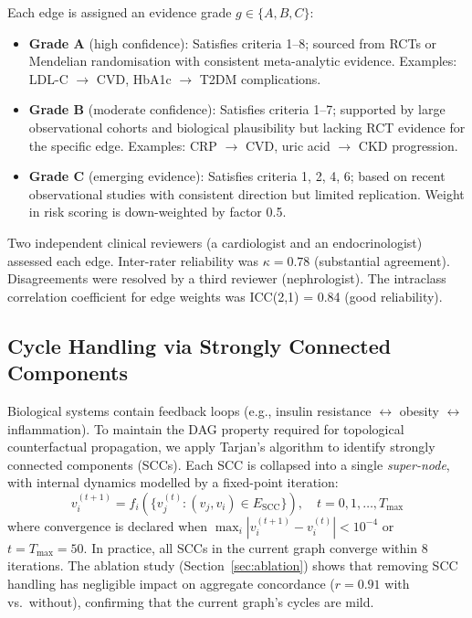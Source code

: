 \documentclass[runningheads]{llncs}
\begin{document}
Each edge is assigned an evidence grade $g \in \{A, B, C\}$:
\begin{itemize}
\item \textbf{Grade A} (high confidence): Satisfies criteria
  1--8; sourced from RCTs or Mendelian randomisation with consistent
  meta-analytic evidence.  Examples: LDL-C $\rightarrow$ CVD, HbA1c
  $\rightarrow$ T2DM complications.
\item \textbf{Grade B} (moderate confidence): Satisfies criteria
  1--7; supported by large observational cohorts and biological
  plausibility but lacking RCT evidence for the specific edge.
  Examples: CRP $\rightarrow$ CVD, uric acid $\rightarrow$ CKD
  progression.
\item \textbf{Grade C} (emerging evidence): Satisfies criteria
  1, 2, 4, 6; based on recent observational studies with consistent
  direction but limited replication.  Weight in risk scoring is
  down-weighted by factor 0.5.
\end{itemize}

Two independent clinical reviewers (a cardiologist and an
endocrinologist) assessed each edge.  Inter-rater reliability was
$\kappa = 0.78$ (substantial agreement).  Disagreements were resolved
by a third reviewer (nephrologist).  The intraclass correlation
coefficient for edge weights was ICC(2,1) = 0.84 (good reliability).

\subsection{Cycle Handling via Strongly Connected Components}
\label{sec:cycles}

Biological systems contain feedback loops (e.g., insulin resistance
$\leftrightarrow$ obesity $\leftrightarrow$ inflammation).  To
maintain the DAG property required for topological counterfactual
propagation, we apply Tarjan's algorithm to identify strongly
connected components (SCCs).  Each SCC is collapsed into a single
\emph{super-node}, with internal dynamics modelled by a fixed-point
iteration:
\begin{equation}\label{eq:scc}
v_i^{(t+1)} = f_i\!\left(\{v_j^{(t)} : (v_j, v_i) \in E_{\mathrm{SCC}}\}\right),
\quad t = 0, 1, \ldots, T_{\max}
\end{equation}
where convergence is declared when
$\max_i |v_i^{(t+1)} - v_i^{(t)}| < 10^{-4}$ or $t = T_{\max} = 50$.
In practice, all SCCs in the current graph converge within 8
iterations.  The ablation study (Section~\ref{sec:ablation}) shows
that removing SCC handling has negligible impact on aggregate
concordance ($r = 0.91$ with vs.\ without), confirming that the
current graph's cycles are mild.
\end{document}
